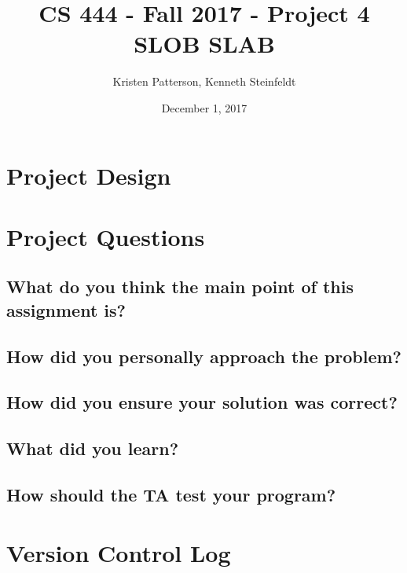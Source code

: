\documentclass[10pt,letterpaper,onecolumn,draftclsnofoot]{IEEEtran}
\begin{document}
\begin{titlepage}

	\title{CS 444 - Fall 2017 - Project 4 \\ SLOB SLAB}
	\author{Kristen Patterson, Kenneth Steinfeldt}
	\date{December 1, 2017}
	\maketitle
\end{titlepage}

\section{Project Design}

\section{Project Questions}
\subsection{What do you think the main point of this assignment is?}

\subsection{How did you personally approach the problem?}

\subsection{How did you ensure your solution was correct?}

\subsection{What did you learn?}

\subsection{How should the TA test your program?}

\section{Version Control Log}
\end{document}
